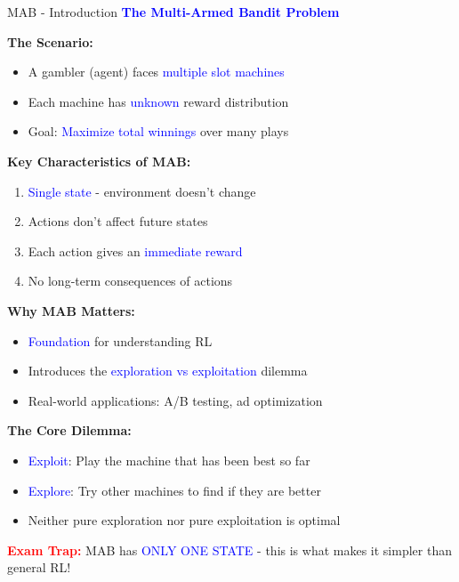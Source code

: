 \documentclass[8pt]{beamer}
\begin{document}
	\begin{frame}{MAB - Introduction}
		\fontsize{6.5}{7.5}\selectfont
		\textcolor{blue}{\textbf{The Multi-Armed Bandit Problem}}
		
		\textbf{The Scenario:}
		\begin{itemize}
			\item A gambler (agent) faces \textcolor{blue}{multiple slot machines}
			\item Each machine has \textcolor{blue}{unknown} reward distribution
			\item Goal: \textcolor{blue}{Maximize total winnings} over many plays
		\end{itemize}
		
		\textbf{Key Characteristics of MAB:}
		\begin{enumerate}
			\item \textcolor{blue}{Single state} - environment doesn't change
			\item Actions don't affect future states
			\item Each action gives an \textcolor{blue}{immediate reward}
			\item No long-term consequences of actions
		\end{enumerate}
		
		\textbf{Why MAB Matters:}
		\begin{itemize}
			\item \textcolor{blue}{Foundation} for understanding RL
			\item Introduces the \textcolor{blue}{exploration vs exploitation} dilemma
			\item Real-world applications: A/B testing, ad optimization
		\end{itemize}
		
		\textbf{The Core Dilemma:}
		\begin{itemize}
			\item \textcolor{blue}{Exploit}: Play the machine that has been best so far
			\item \textcolor{blue}{Explore}: Try other machines to find if they are better
			\item Neither pure exploration nor pure exploitation is optimal
		\end{itemize}
		
		\textcolor{red}{\textbf{Exam Trap:}} MAB has \textcolor{blue}{ONLY ONE STATE} - this is what makes it simpler than general RL!
	\end{frame}
	
\end{document}
